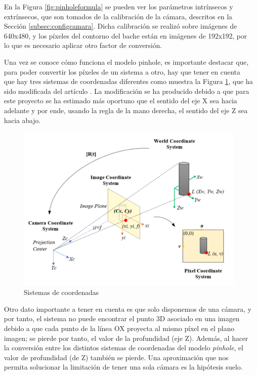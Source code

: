 En la Figura \ref{fig:pinholeformula} se pueden ver los parámetros intrínsecos y extrínsecos, que son tomados de la calibración de la cámara, descritos en la Sección \ref{subsec:configcamara}. Dicha calibración se realizó sobre imágenes de 640x480, y los píxeles del contorno del bache están en imágenes de 192x192, por lo que es necesario aplicar otro factor de conversión. 

Una vez se conoce cómo funciona el modelo pinhole, es importante destacar que, para poder convertir los píxeles de un sistema a otro, hay que tener en cuenta que hay tres sistemas de coordenadas diferentes como muestra la Figura \ref{fig:siscoordenadas}, que ha sido modificada del artículo \cite{201705.0170}. La modificación se ha producido debido a que para este proyecto se ha estimado más oportuno que el sentido del eje X sea hacia adelante y por ende, usando la regla de la mano derecha, el sentido del eje Z sea hacia abajo.

 \begin{figure} [h!]
	\begin{center}
		\includegraphics[width=14cm]{figs/cap6/pinholecoordinates.png}
	\end{center}
	\caption{Sistemas de coordenadas}
	\label{fig:siscoordenadas}
\end{figure}

Otro dato importante a tener en cuenta es que solo disponemos de una cámara, y por tanto, el sistema no puede encontrar el punto 3D asociado en una imagen debido a que cada punto de la línea OX proyecta al mismo píxel en el plano imagen; se pierde por tanto, el valor de la profundidad (eje Z). Además, al hacer la conversión entre los distintos sistemas de coordenadas del modelo \textit{pinhole}, el valor de profundidad (de Z) también se pierde. Una aproximación que nos permita solucionar la limitación de tener una sola cámara es la hipótesis suelo. 

